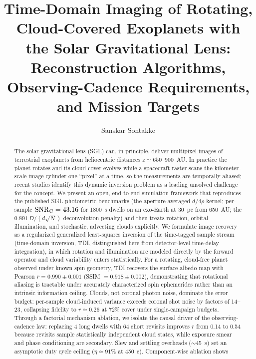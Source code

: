 \documentclass[twocolumn]{emulateapj}
\begin{document}
\title{Time-Domain Imaging of Rotating, Cloud-Covered Exoplanets with the
Solar Gravitational Lens: Reconstruction Algorithms, Observing-Cadence
Requirements, and Mission Targets}

\author{Sanskar Sontakke}

\begin{abstract}
The solar gravitational lens (SGL) can, in principle, deliver multipixel
images of terrestrial exoplanets from heliocentric distances
$z\simeq650$--900~AU. In practice the planet rotates and its cloud cover
evolves while a spacecraft raster-scans the kilometer-scale image cylinder
one ``pixel'' at a time, so the measurements are temporally aliased; recent
studies identify this dynamic inversion problem as a leading unsolved
challenge for the concept. We present an open, end-to-end simulation
framework that reproduces the published SGL photometric benchmarks (the
aperture-averaged $d/4\rho$ kernel; per-sample $\mathrm{SNR}_{\rm C}=43.16$
for 1800~s dwells on an exo-Earth at 30~pc from 650~AU; the
$0.891\,D/(d\sqrt{N})$ deconvolution penalty) and then treats rotation,
orbital illumination, and stochastic, advecting clouds explicitly. We
formulate image recovery as a regularized generalized least-squares
inversion of the time-tagged sample stream (time-domain inversion, TDI,
distinguished here from detector-level time-delay integration), in which
rotation and illumination are modeled directly by the forward operator and
cloud variability enters statistically. For a rotating, cloud-free planet
observed under known spin geometry, TDI recovers the surface albedo map with
Pearson $r=0.990\pm0.001$ (SSIM $=0.918\pm0.002$), demonstrating that
rotational aliasing is tractable under accurately characterized spin
ephemerides rather than an intrinsic information ceiling. Clouds, not
coronal photon noise, dominate the error budget: per-sample cloud-induced
variance exceeds coronal shot noise by factors of 14--23, collapsing
fidelity to $r\simeq0.26$ at 72\% cover under single-campaign budgets.
Through a factorial mechanism ablation, we isolate the causal driver of the
observing-cadence law: replacing 4 long dwells with 64 short revisits
improves $r$ from 0.14 to 0.54 because revisits sample statistically
independent cloud states, while exposure smear and phase conditioning are
secondary. Slew and settling overheads ($\sim$45~s) set an asymptotic duty
cycle ceiling ($\eta\simeq91\%$ at 450~s). Component-wise ablation shows

\end{abstract}
\end{document}
